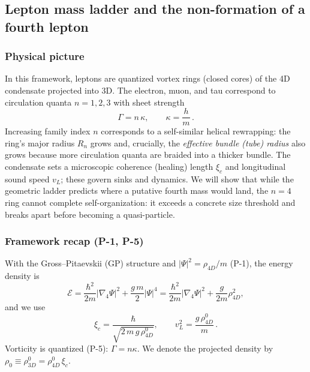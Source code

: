 \subsection{Lepton mass ladder and the non-formation of a fourth lepton}\label{sec:leptons}

\subsubsection{Physical picture}
In this framework, leptons are quantized vortex rings (closed cores) of the 4D condensate projected into 3D. The electron, muon, and tau correspond to circulation quanta \(n=1,2,3\) with sheet strength
\[
\Gamma=n\,\kappa,\qquad \kappa=\frac{h}{m}\,.
\]
Increasing family index \(n\) corresponds to a self-similar helical rewrapping: the ring’s major radius \(R_n\) grows and, crucially, the \emph{effective bundle (tube) radius} also grows because more circulation quanta are braided into a thicker bundle. The condensate sets a microscopic coherence (healing) length \(\xi_c\) and longitudinal sound speed \(v_L\); these govern sinks and dynamics. We will show that while the geometric ladder predicts where a putative fourth mass would land, the \(n{=}4\) ring cannot complete self-organization: it exceeds a concrete size threshold and breaks apart before becoming a quasi-particle.

\subsubsection{Framework recap (P-1, P-5)}
With the Gross–Pitaevskii (GP) structure and \(|\Psi|^2=\rho_{4D}/m\) (P-1), the energy density is
\[
\mathcal E=\frac{\hbar^2}{2m}|\nabla_4\Psi|^2+\frac{g\,m}{2}|\Psi|^4
=\frac{\hbar^2}{2m}|\nabla_4\Psi|^2+\frac{g}{2m}\rho_{4D}^2,
\]
and we use
\[
\xi_c=\frac{\hbar}{\sqrt{2\,m\,g\,\rho_{4D}^0}},\qquad
v_L^2=\frac{g\,\rho_{4D}^0}{m}\,.
\]
Vorticity is quantized (P-5): \(\Gamma=n\kappa\). We denote the projected density by \(\rho_0\equiv\rho_{3D}^0=\rho_{4D}^0\,\xi_c\).

